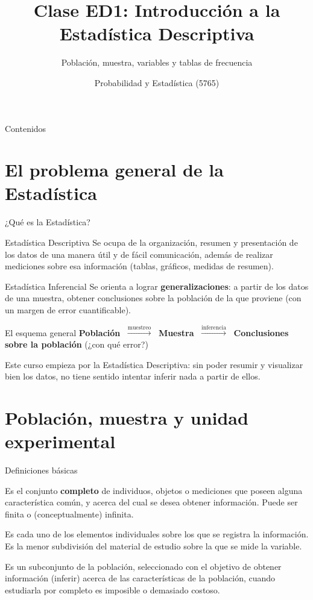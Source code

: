 \documentclass[aspectratio=169,11pt]{beamer}
\title[Prob. y Estadística]{Clase ED1: Introducción a la Estadística Descriptiva}
\subtitle{Población, muestra, variables y tablas de frecuencia}
\institute[UNS]{Universidad Nacional del Sur \\ Departamento de Matemática}
\author{Probabilidad y Estadística (5765)}
\date{}
\begin{document}
\begin{frame}
\titlepage
\end{frame}

\begin{frame}{Contenidos}
\tableofcontents
\end{frame}

\section{El problema general de la Estadística}

\begin{frame}{¿Qué es la Estadística?}
\begin{block}{Estadística Descriptiva}
Se ocupa de la organización, resumen y presentación de los datos de una manera útil y de fácil comunicación, además de realizar mediciones sobre esa información (tablas, gráficos, medidas de resumen).
\end{block}
\begin{block}{Estadística Inferencial}
Se orienta a lograr \textbf{generalizaciones}: a partir de los datos de una muestra, obtener conclusiones sobre la población de la que proviene (con un margen de error cuantificable).
\end{block}
\begin{alertblock}{El esquema general}
\centering
\textbf{Población} $\;\xrightarrow{\text{muestreo}}\;$ \textbf{Muestra} $\;\xrightarrow{\text{inferencia}}\;$ \textbf{Conclusiones sobre la población}\; (¿con qué error?)
\end{alertblock}
Este curso empieza por la Estadística Descriptiva: sin poder resumir y visualizar bien los datos, no tiene sentido intentar inferir nada a partir de ellos.
\end{frame}

\section{Población, muestra y unidad experimental}

\begin{frame}{Definiciones básicas}
\begin{definition}[Población]
Es el conjunto \textbf{completo} de individuos, objetos o mediciones que poseen alguna característica común, y acerca del cual se desea obtener información. Puede ser finita o (conceptualmente) infinita.
\end{definition}
\begin{definition}
Es cada uno de los elementos individuales sobre los que se registra la información. Es la menor subdivisión del material de estudio sobre la que se mide la variable.
\end{definition}
\begin{definition}[Muestra]
Es un subconjunto de la población, seleccionado con el objetivo de obtener información (inferir) acerca de las características de la población, cuando estudiarla por completo es imposible o demasiado costoso.
\end{definition}
\end{frame}
\end{document}
